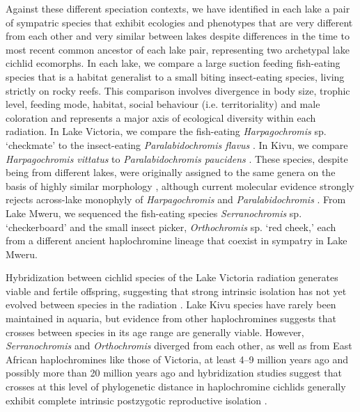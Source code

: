 Against these different speciation contexts, we have identified in each lake a pair of sympatric species that exhibit ecologies and phenotypes that are very different from each other and very similar between lakes despite differences in the time to most recent common ancestor of each lake pair, representing two archetypal lake cichlid ecomorphs. In each lake, we compare a large suction feeding fish-eating species that is a habitat generalist to a small biting insect-eating species, living strictly on rocky reefs. This comparison involves divergence in body size, trophic level, feeding mode, habitat, social behaviour (i.e. territoriality) and male coloration and represents a major axis of ecological diversity within each radiation. In Lake Victoria, we compare the fish-eating {\em Harpagochromis} sp. `checkmate' to the insect-eating {\em Paralabidochromis flavus} \cite{seehausen1998mbipi}. In Kivu, we compare {\em Harpagochromis vittatus} to {\em Paralabidochromis paucidens} \cite{snoeks1994haplochromines}. These species, despite being from different lakes, were originally assigned to the same genera on the basis of highly similar morphology \cite{greenwood1979towards}, although current molecular evidence strongly rejects across-lake monophyly of {\em Harpagochromis} and {\em Paralabidochromis} \cite{bezault2011population}. From Lake Mweru, we sequenced the fish-eating species {\em Serranochromis} sp. `checkerboard' and the small insect picker, {\em Orthochromis} sp. `red cheek,' each from a different ancient haplochromine lineage that coexist in sympatry in Lake Mweru.

Hybridization between cichlid species of the Lake Victoria radiation generates viable and fertile offspring, suggesting that strong intrinsic isolation has not yet evolved between species in the radiation \cite{stelkens2009genetic, stelkens2015hybrid}. Lake Kivu species have rarely been maintained in aquaria, but evidence from other haplochromines suggests that crosses between species in its age range are generally viable. However, {\em Serranochromis}  and {\em Orthochromis} diverged from each other, as well as from East African haplochromines like those of Victoria, at least 4–9 million years ago \cite{genner2007age, friedman2013molecular} and possibly more than 20 million years ago \cite{genner2007age, wagner2012ecological, schwarzer2012repeated} and hybridization studies suggest that crosses at this level of phylogenetic distance in haplochromine cichlids generally exhibit complete intrinsic postzygotic reproductive isolation \cite{stelkens2009genetic, stelkens2015hybrid}.

